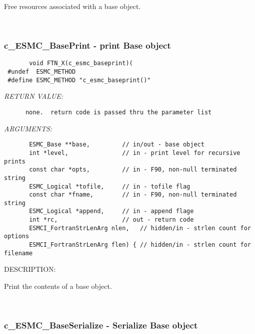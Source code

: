        Free resources associated with a base object.
   
 
\mbox{}\hrulefill\ 
 
\subsubsection [c\_ESMC\_BasePrint] {c\_ESMC\_BasePrint - print Base object }


  
\begin{verbatim}       void FTN_X(c_esmc_baseprint)(
 #undef  ESMC_METHOD
 #define ESMC_METHOD "c_esmc_baseprint()"\end{verbatim}{\em RETURN VALUE:}
\begin{verbatim}      none.  return code is passed thru the parameter list
   \end{verbatim}{\em ARGUMENTS:}
\begin{verbatim}       ESMC_Base **base,         // in/out - base object
       int *level,               // in - print level for recursive prints
       const char *opts,         // in - F90, non-null terminated string
       ESMC_Logical *tofile,     // in - tofile flag
       const char *fname,        // in - F90, non-null terminated string
       ESMC_Logical *append,     // in - append flage
       int *rc,                  // out - return code
       ESMCI_FortranStrLenArg nlen,   // hidden/in - strlen count for options
       ESMCI_FortranStrLenArg flen) { // hidden/in - strlen count for filename
   \end{verbatim}
{\sf DESCRIPTION:\\ }


       Print the contents of a base object.
   
 
\mbox{}\hrulefill\
 
\subsubsection [c\_ESMC\_BaseSerialize] {c\_ESMC\_BaseSerialize - Serialize Base object }


